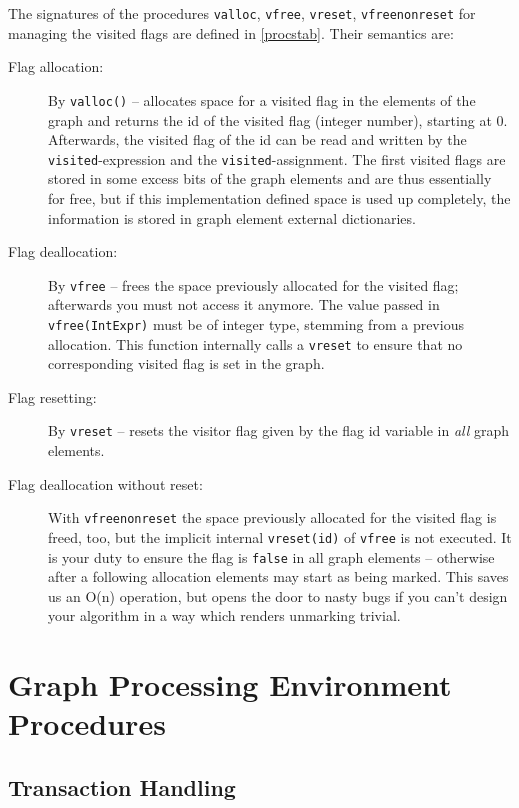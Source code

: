 The signatures of the procedures \texttt{valloc}, \texttt{vfree}, \texttt{vreset}, \texttt{vfreenonreset} for managing the visited flags are defined in \ref{procstab}.
Their semantics are:
\begin{description}
\item[Flag allocation:] By \texttt{valloc()}\label{allocvisitflag} -- allocates space for a visited flag in the elements of the graph and returns the id of the visited flag (integer number), starting at 0.
Afterwards, the visited flag of the id can be read and written by the \texttt{visited}-expression and the \texttt{visited}-assignment.
The first visited flags are stored in some excess bits of the graph elements and are thus essentially for free,
but if this implementation defined space is used up completely, the information is stored in graph element external dictionaries.
\item[Flag deallocation:] By \texttt{vfree} -- frees the space previously allocated for the visited flag; afterwards you must not access it anymore.
The value passed in \texttt{vfree(IntExpr)} must be of integer type, stemming from a previous allocation.
This function internally calls a \texttt{vreset} to ensure that no corresponding visited flag is set in the graph.
\item[Flag resetting:] By \texttt{vreset} -- resets the visitor flag given by the flag id variable in \emph{all} graph elements.
\item[Flag deallocation without reset:] With \texttt{vfreenonreset} the space previously allocated for the visited flag is freed, too, but the implicit internal \texttt{vreset(id)} of \texttt{vfree} is not executed. It is your duty to ensure the flag is \texttt{false} in all graph elements -- otherwise after a following allocation elements may start as being marked. This saves us an O(n) operation, but opens the door to nasty bugs if you can't design your algorithm in a way which renders unmarking trivial.
\end{description}


\section{Graph Processing Environment Procedures}

\subsection{Transaction Handling}\label{sub:transaction}

